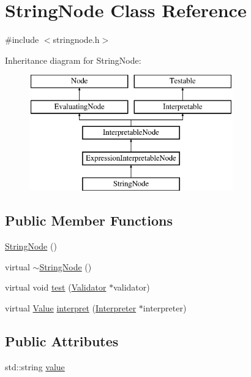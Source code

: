\hypertarget{classStringNode}{}\section{String\+Node Class Reference}
\label{classStringNode}


{\ttfamily \#include $<$stringnode.\+h$>$}

Inheritance diagram for String\+Node\+:\begin{figure}[H]
\begin{center}
\leavevmode
\includegraphics[height=5.000000cm]{classStringNode}
\end{center}
\end{figure}
\subsection*{Public Member Functions}
\begin{DoxyCompactItemize}
\item 
\hyperlink{classStringNode_a3ac1767041e5519e52ada6e7c5ecbbe4}{String\+Node} ()
\item 
virtual \hyperlink{classStringNode_a2b2f8f89db3402822e55da8ede0ca443}{$\sim$\+String\+Node} ()
\item 
virtual void \hyperlink{classStringNode_a3836ad2a1bb6f86cd52663653a65bad8}{test} (\hyperlink{classValidator}{Validator} $\ast$validator)
\item 
virtual \hyperlink{classValue}{Value} \hyperlink{classStringNode_ae92c0858cd07baf0c6417f7bdfce9f0d}{interpret} (\hyperlink{classInterpreter}{Interpreter} $\ast$interpreter)
\end{DoxyCompactItemize}
\subsection*{Public Attributes}
\begin{DoxyCompactItemize}
\item 
std\+::string \hyperlink{classStringNode_a52fd9cb80da963e39d0d6d33d5396c93}{value}
\end{DoxyCompactItemize}
